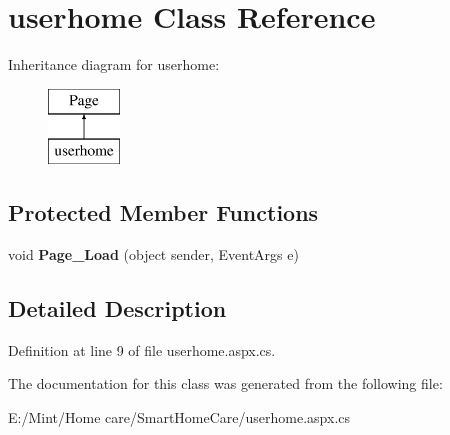 \hypertarget{classuserhome}{\section{userhome Class Reference}
\label{classuserhome}
}
Inheritance diagram for userhome\-:\begin{figure}[H]
\begin{center}
\leavevmode
\includegraphics[height=2.000000cm]{classuserhome}
\end{center}
\end{figure}
\subsection*{Protected Member Functions}
\begin{DoxyCompactItemize}
\item 
\hypertarget{classuserhome_a7d5e583242441d72aa4e429048b04d5b}{void {\bfseries Page\-\_\-\-Load} (object sender, Event\-Args e)}\label{classuserhome_a7d5e583242441d72aa4e429048b04d5b}

\end{DoxyCompactItemize}


\subsection{Detailed Description}


Definition at line 9 of file userhome.\-aspx.\-cs.



The documentation for this class was generated from the following file\-:\begin{DoxyCompactItemize}
\item 
E\-:/\-Mint/\-Home care/\-Smart\-Home\-Care/userhome.\-aspx.\-cs\end{DoxyCompactItemize}
